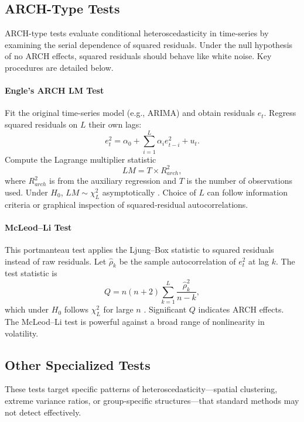 \subsection{ARCH-Type Tests}\label{sec:arch-tests}
ARCH-type tests evaluate conditional heteroscedasticity in time-series by examining the serial dependence of squared residuals. Under the null hypothesis of no ARCH effects, squared residuals should behave like white noise. Key procedures are detailed below.

\paragraph{Engle’s ARCH LM Test}\label{sec:arch-lm}
Fit the original time-series model (e.g., ARIMA) and obtain residuals $e_t$. Regress squared residuals on $L$ their own lags:
\begin{equation}
  e_t^2 = \alpha_0 + \sum_{i=1}^L \alpha_i e_{t-i}^2 + u_t.
\end{equation}
Compute the Lagrange multiplier statistic
\[
  LM = T \times R^2_{arch},
\]
where $R^2_{arch}$ is from the auxiliary regression and $T$ is the number of observations used. Under $H_0$, $LM\sim\chi^2_L$ asymptotically \citep{engle1982autoregressive}. Choice of $L$ can follow information criteria or graphical inspection of squared‐residual autocorrelations.

\paragraph{McLeod–Li Test}\label{sec:mcleod-li}
This portmanteau test applies the Ljung–Box statistic to squared residuals instead of raw residuals. Let $\hat{\rho}_k$ be the sample autocorrelation of $e_t^2$ at lag $k$. The test statistic is
\[
  Q = n(n+2) \sum_{k=1}^L \frac{\hat{\rho}_k^2}{n-k},
\]
which under $H_0$ follows $\chi^2_L$ for large $n$ \citep{mcleod1978diagnosis}. Significant $Q$ indicates ARCH effects. The McLeod–Li test is powerful against a broad range of nonlinearity in volatility.



\subsection{Other Specialized Tests}\label{sec:specialized}
These tests target specific patterns of heteroscedasticity—spatial clustering, extreme variance ratios, or group‐specific structures—that standard methods may not detect effectively.


